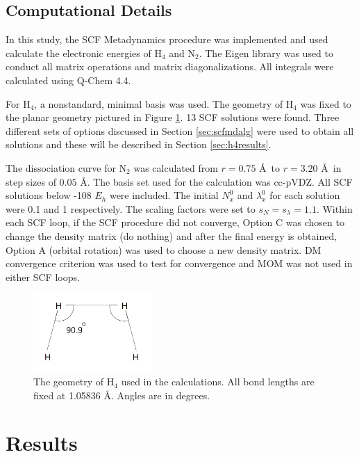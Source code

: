 \documentclass[final,3p,times,twocolumn]{elsarticle}
\begin{document}
\subsection{Computational Details} \label{sec:compdetails}
In this study, the SCF Metadynamics procedure was implemented and used calculate the electronic energies of H$_4$ and N$_2$. The Eigen library\cite{eigen} was used to conduct all matrix operations and matrix diagonalizations. All integrals were calculated using Q-Chem 4.4.\cite{qchem}

For H$_4$, a nonstandard, minimal basis was used.\cite{h4basis} The geometry of H$_4$ was fixed to the planar geometry pictured in Figure \ref{fig:h4geo}. 13 SCF solutions were found. Three different sets of options discussed in Section \ref{sec:scfmdalg} were used to obtain all solutions and these will be described in Section \ref{sec:h4results}.

The dissociation curve for N$_2$ was calculated from $r = 0.75$ \AA\ to $r = 3.20$ \AA\ in step sizes of $0.05$ \AA. The basis set used for the calculation was cc-pVDZ\cite{dunning}. All SCF solutions below -108 $E_h$ were included. The initial $N_x^0$ and $\lambda_x^0$ for each solution were 0.1 and 1 respectively. The scaling factors were set to $s_N = s_\lambda = 1.1$. Within each SCF loop, if the SCF procedure did not converge, Option C was chosen to change the density matrix (do nothing) and after the final energy is obtained, Option A (orbital rotation) was used to choose a new density matrix. DM convergence criterion was used to test for convergence and MOM was not used in either SCF loops.

\begin{figure}
\centering
\includegraphics[width=0.4\textwidth]{h4_geo.png}
\caption{The geometry of H$_4$ used in the calculations. All bond lengths are fixed at 1.05836 \AA. Angles are in degrees.}
\label{fig:h4geo}
\end{figure}


\section{Results} \label{sec:results}
\end{document}
